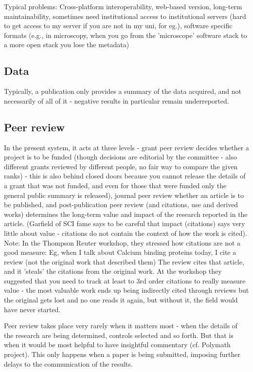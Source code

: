 \documentclass[final,authoryear,3p]{elsarticle-open-drafting}
\begin{document}
Typical problems: Cross-platform interoperability, web-based version, long-term maintainability, sometimes need institutional access to institutional servers (hard to get access to my server if you are not in my uni, for eg.), software specific formats (e.g., in microscopy, when you go from the 'microscope' software stack to a more open stack you lose the metadata)

\subsection{Data}
Typically, a publication only provides a summary of the data acquired, and not necessarily of all of it - negative results
in particular remain underreported.

\subsection{Peer review}
In the present system, it acts at three levels - grant peer review decides whether a project is to be funded (though decisions are editorial by the committee - also different grants reviewed by different people, no fair way to compare the given ranks) - this is also behind closed doors because you cannot release the details of a grant that was not funded, and even for those that were funded only the general public summary is released), journal peer review  whether an article is to be published, and post-publication peer review (and citations, use and derived works) determines the long-term value and impact of the research reported in the article. (Garfield of SCI fame says to be careful that impact (citations) says very little about value  - citations do not contain the context of how the work is cited). 
Note: In the Thompson Reuter workshop, they stressed how citations are not a good measure: Eg, when I talk about Calcium binding proteins today, I cite a review (not the original work that described them) The review cites that article, and it 'steals' the citations from the original work. At the workshop they suggested that you need to track at least to 3rd order citations to really measure value - the most valuable work ends up being indirectly cited through reviews but the original gets lost and no one reads it again, but without it, the field would have never started. 

Peer review takes place very rarely when it matters most - when the details of the research are being determined, controls selected and so forth. But that is when it would be most helpful to have insightful commentary (cf. Polymath project). This only happens when a paper is being submitted, imposing further delays to the communication of the results. 
\end{document}
